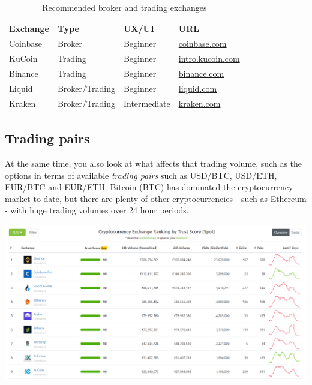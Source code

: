 \begin{table}[b]

\centering

\caption{Recommended broker and trading exchanges}
\begin{tabular}{llll} 
\toprule

\textbf{Exchange} & \textbf{Type } & \textbf{UX/UI} & \textbf{URL}\\
\midrule

Coinbase & Broker & Beginner & \href{https://www.coinbase.com/join/51954a2b26a1bcc484000015}{coinbase.com} \\
KuCoin   &  Trading & Beginner & \href{https://www.kucoin.com/#/?r=aNuPeb}{intro.kucoin.com} \\
Binance  &  Trading & Beginner & \href{https://www.binance.com/?ref=35602166}{binance.com} \\
Liquid   &  Broker/Trading & Beginner & \href{https://www.liquid.com?affiliate=nUfQhVL4164547}{liquid.com} \\
Kraken   &  Broker/Trading & Intermediate & \href{https://www.kraken.com/}{kraken.com} \\


\bottomrule
\end{tabular}
\label{tab:exchange selection}
\end{table}


\subsection*{Trading pairs}
At the same time, you also look at what affects that trading volume, such as the options in terms of available \emph{trading pairs} such as USD/BTC, USD/ETH, EUR/BTC and EUR/ETH. Bitcoin (BTC) has dominated the cryptocurrency market to date, but there are plenty of other cryptocurrencies - such as Ethereum - with huge trading volumes over 24 hour periods.

\bigskip
\begin{borderbox}
    \includegraphics[width=\textwidth]{img/ch-exchanges/exchange-ranking.png}
\end{borderbox}
\medskip

